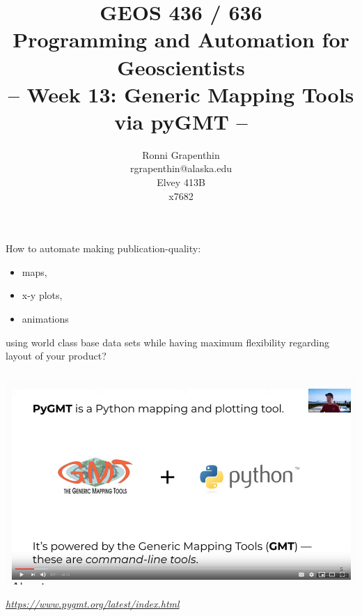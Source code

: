 \documentclass[unknownkeysallowed]{beamer}
\title[PAG]%
{GEOS 436 / 636\\
Programming and Automation for Geoscientists\\[20pt]
-- Week 13: Generic Mapping Tools via pyGMT --
}
\author[Grapenthin]%
{Ronni Grapenthin\\
rgrapenthin@alaska.edu\\
Elvey 413B\\
x7682}
\institute[UAF] %
{}
\date[]{}
\begin{document}
\lstset{numbers=left, numberstyle=\tiny, stepnumber=2, basicstyle=\ttfamily, numbersep=5pt, xleftmargin=10pt}


	\begin{frame}
	\begin{center}
		\titlepage
	\end{center}
	\end{frame}


\begin{frame}
\frametitle{}
	How to automate making publication-quality:

	\begin{itemize}
		\item maps,
		\item x-y plots, 
		\item animations 
	\end{itemize}

	using world class base data sets while having maximum flexibility regarding layout of your product?
\end{frame}


\begin{frame}
\frametitle{}
	\begin{center}
		\includegraphics[width=\textwidth]{../figures/pygmt_header.png}	
	\end{center}
	\begin{flushright}
	\tiny{\emph{\url{https://www.pygmt.org/latest/index.html}}}
	\end{flushright}	
\end{frame}
\end{document}
